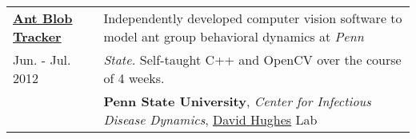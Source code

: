 \documentclass{resume}[10pt, a4paper]
\begin{document}
\begin{tabular}{l | l}
    \textbf{\href{https://github.com/jtcho/AntParticleTracker}{Ant Blob Tracker}} & Independently developed computer vision software to model ant group behavioral dynamics at \textit{Penn}\\
            Jun. - Jul. 2012&\textit{State.} Self-taught C++ and OpenCV over the course of 4 weeks.\\
                     &\textbf{Penn State University}, \textit{Center for Infectious Disease Dynamics}, \href{http://www.hugheslab.com/}{David Hughes} Lab

\end{tabular}

%

\end{document}
